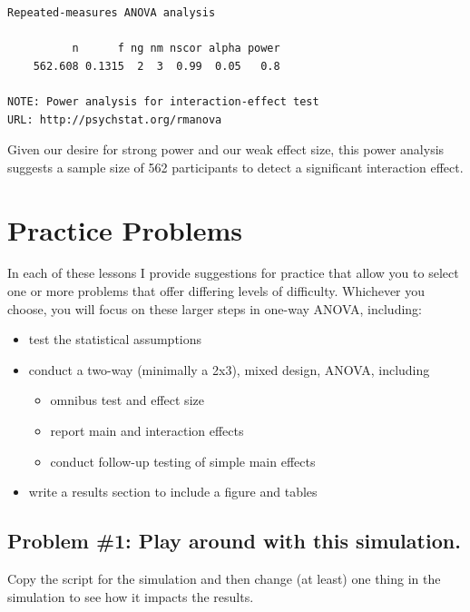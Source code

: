 \documentclass[
  11pt,
]{book}
\providecommand{\tightlist}{%
  \setlength{\itemsep}{0pt}\setlength{\parskip}{0pt}}
\begin{document}
\begin{verbatim}
Repeated-measures ANOVA analysis

          n      f ng nm nscor alpha power
    562.608 0.1315  2  3  0.99  0.05   0.8

NOTE: Power analysis for interaction-effect test
URL: http://psychstat.org/rmanova
\end{verbatim}

Given our desire for strong power and our weak effect size, this power analysis suggests a sample size of 562 participants to detect a significant interaction effect.

\hypertarget{practice-problems-7}{%
\section{Practice Problems}\label{practice-problems-7}}

In each of these lessons I provide suggestions for practice that allow you to select one or more problems that offer differing levels of difficulty. Whichever you choose, you will focus on these larger steps in one-way ANOVA, including:

\begin{itemize}
\tightlist
\item
  test the statistical assumptions
\item
  conduct a two-way (minimally a 2x3), mixed design, ANOVA, including

  \begin{itemize}
  \tightlist
  \item
    omnibus test and effect size
  \item
    report main and interaction effects
  \item
    conduct follow-up testing of simple main effects
  \end{itemize}
\item
  write a results section to include a figure and tables
\end{itemize}

\hypertarget{problem-1-play-around-with-this-simulation.-2}{%
\subsection{Problem \#1: Play around with this simulation.}\label{problem-1-play-around-with-this-simulation.-2}}

Copy the script for the simulation and then change (at least) one thing in the simulation to see how it impacts the results.
\end{document}
